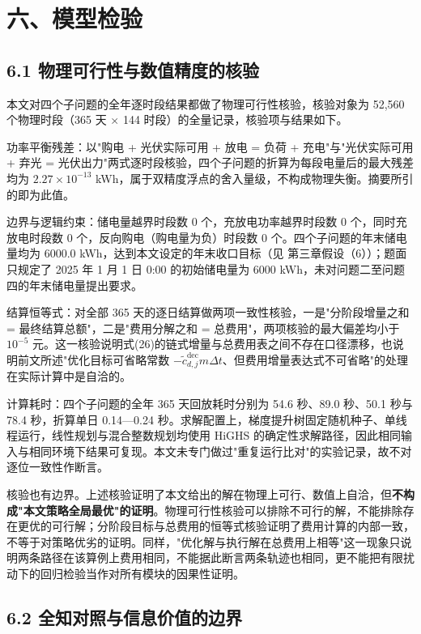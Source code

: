 \documentclass[12pt,a4paper]{ctexart}
\begin{document}
\section*{六、模型检验}

\subsection*{6.1 物理可行性与数值精度的核验}

本文对四个子问题的全年逐时段结果都做了物理可行性核验，核验对象为 52,560 个物理时段（365 天 $\times$ 144 时段）的全量记录，核验项与结果如下。

功率平衡残差：以"购电 + 光伏实际可用 + 放电 = 负荷 + 充电"与"光伏实际可用 + 弃光 = 光伏出力"两式逐时段核验，四个子问题的折算为每段电量后的最大残差均为 $2.27\times10^{-13}$ kWh，属于双精度浮点的舍入量级，不构成物理失衡。摘要所引的即为此值。

边界与逻辑约束：储电量越界时段数 0 个，充放电功率越界时段数 0 个，同时充放电时段数 0 个，反向购电（购电量为负）时段数 0 个。四个子问题的年末储电量均为 6000.0 kWh，达到本文设定的年末收口目标（见 第三章假设（6））；题面只规定了 2025 年 1 月 1 日 0:00 的初始储电量为 6000 kWh，未对问题二至问题四的年末储电量提出要求。

结算恒等式：对全部 365 天的逐日结算做两项一致性核验，一是"分阶段增量之和 = 最终结算总额"，二是"费用分解之和 = 总费用"，两项核验的最大偏差均小于 $10^{-5}$ 元。这一核验说明式(26)的链式增量与总费用表之间不存在口径漂移，也说明前文所述"优化目标可省略常数 $-\widetilde c_{d,j}^{\mathrm{dec}}m\Delta t$、但费用增量表达式不可省略"的处理在实际计算中是自洽的。

计算耗时：四个子问题的全年 365 天回放耗时分别为 54.6 秒、89.0 秒、50.1 秒与 78.4 秒，折算单日 0.14—0.24 秒。求解配置上，梯度提升树固定随机种子、单线程运行，线性规划与混合整数规划均使用 HiGHS 的确定性求解路径，因此相同输入与相同环境下结果可复现。本文未专门做过"重复运行比对"的实验记录，故不对逐位一致性作断言。

核验也有边界。上述核验证明了本文给出的解在物理上可行、数值上自洽，但\textbf{不构成"本文策略全局最优"的证明}。物理可行性核验可以排除不可行的解，不能排除存在更优的可行解；分阶段目标与总费用的恒等式核验证明了费用计算的内部一致，不等于对策略优劣的证明。同样，"优化解与执行解在总费用上相等"这一现象只说明两条路径在该算例上费用相同，不能据此断言两条轨迹也相同，更不能把有限扰动下的回归检验当作对所有模块的因果性证明。

\subsection*{6.2 全知对照与信息价值的边界}
\end{document}
